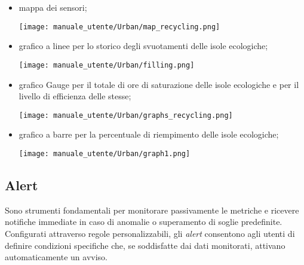 \begin{itemize}
    \begin{itemize}
        \item mappa dei sensori;
        \begin{center}
            \texttt{[image: manuale\_utente/Urban/map\_recycling.png]}
        \end{center}
        \item grafico a linee per lo storico degli svuotamenti delle isole ecologiche;
        \begin{center}
            \texttt{[image: manuale\_utente/Urban/filling.png]}
        \end{center}
        \item grafico Gauge per il totale di ore di saturazione delle isole ecologiche e per il livello di efficienza delle stesse;
        \begin{center}
            \texttt{[image: manuale\_utente/Urban/graphs\_recycling.png]}
        \end{center}
        \item grafico a barre per la percentuale di riempimento delle isole ecologiche;
        \begin{center}
            \texttt{[image: manuale\_utente/Urban/graph1.png]}
        \end{center}
    \end{itemize}
\end{itemize}

\subsection{Alert}
Sono strumenti fondamentali per monitorare passivamente le metriche e ricevere notifiche immediate in caso di anomalie o superamento di soglie predefinite. Configurati attraverso regole personalizzabili, gli \textit{alert} consentono agli utenti di definire condizioni specifiche che, se soddisfatte dai dati monitorati, attivano automaticamente un avviso.

